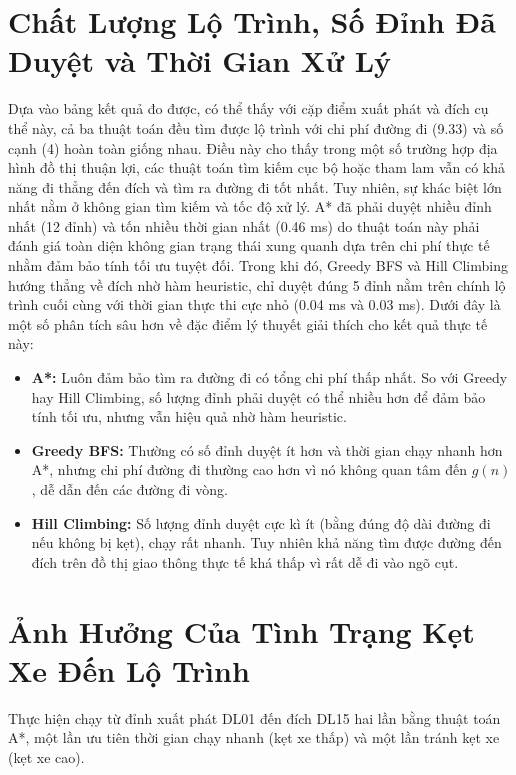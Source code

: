 \section{Chất Lượng Lộ Trình, Số Đỉnh Đã Duyệt và Thời Gian Xử Lý}

Dựa vào bảng kết quả đo được, có thể thấy với cặp điểm xuất phát và đích cụ thể này, cả ba thuật toán đều tìm được lộ trình với chi phí đường đi (9.33) và số cạnh (4) hoàn toàn giống nhau. Điều này cho thấy trong một số trường hợp địa hình đồ thị thuận lợi, các thuật toán tìm kiếm cục bộ hoặc tham lam vẫn có khả năng đi thẳng đến đích và tìm ra đường đi tốt nhất. Tuy nhiên, sự khác biệt lớn nhất nằm ở không gian tìm kiếm và tốc độ xử lý. A* đã phải duyệt nhiều đỉnh nhất (12 đỉnh) và tốn nhiều thời gian nhất (0.46 ms) do thuật toán này phải đánh giá toàn diện không gian trạng thái xung quanh dựa trên chi phí thực tế nhằm đảm bảo tính tối ưu tuyệt đối. Trong khi đó, Greedy BFS và Hill Climbing hướng thẳng về đích nhờ hàm heuristic, chỉ duyệt đúng 5 đỉnh nằm trên chính lộ trình cuối cùng với thời gian thực thi cực nhỏ (0.04 ms và 0.03 ms). Dưới đây là một số phân tích sâu hơn về đặc điểm lý thuyết giải thích cho kết quả thực tế này:

\begin{itemize}[itemsep=2pt]
  \item \textbf{A*:} Luôn đảm bảo tìm ra đường đi có tổng chi phí thấp nhất. So với Greedy hay Hill Climbing, số lượng đỉnh phải duyệt có thể nhiều hơn để đảm bảo tính tối ưu, nhưng vẫn hiệu quả nhờ hàm heuristic.
  \item \textbf{Greedy BFS:} Thường có số đỉnh duyệt ít hơn và thời gian chạy nhanh hơn A*, nhưng chi phí đường đi thường cao hơn vì nó không quan tâm đến $g(n)$, dễ dẫn đến các đường đi vòng.
  \item \textbf{Hill Climbing:} Số lượng đỉnh duyệt cực kì ít (bằng đúng độ dài đường đi nếu không bị kẹt), chạy rất nhanh. Tuy nhiên khả năng tìm được đường đến đích trên đồ thị giao thông thực tế khá thấp vì rất dễ đi vào ngõ cụt.
\end{itemize}

\section{Ảnh Hưởng Của Tình Trạng Kẹt Xe Đến Lộ Trình}

Thực hiện chạy từ đỉnh xuất phát DL01 đến đích DL15 hai lần bằng thuật toán A*, một lần ưu tiên thời gian chạy nhanh (kẹt xe thấp) và một lần tránh kẹt xe (kẹt xe cao).

